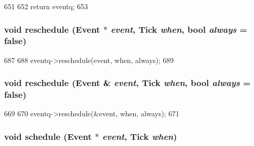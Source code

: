 \begin{DoxyCode}
651     {
652         return eventq;
653     }
\end{DoxyCode}
\hypertarget{classEventManager_a676294f5f01031f3dfdf956185390db8}{
\subsubsection[{reschedule}]{\setlength{\rightskip}{0pt plus 5cm}void reschedule ({\bf Event} $\ast$ {\em event}, \/  {\bf Tick} {\em when}, \/  bool {\em always} = {\ttfamily false})}}
\label{classEventManager_a676294f5f01031f3dfdf956185390db8}



\begin{DoxyCode}
687     {
688         eventq->reschedule(event, when, always);
689     }
\end{DoxyCode}
\hypertarget{classEventManager_a83fe8e2d06cd7c6e36743e5beb07298f}{
\subsubsection[{reschedule}]{\setlength{\rightskip}{0pt plus 5cm}void reschedule ({\bf Event} \& {\em event}, \/  {\bf Tick} {\em when}, \/  bool {\em always} = {\ttfamily false})}}
\label{classEventManager_a83fe8e2d06cd7c6e36743e5beb07298f}



\begin{DoxyCode}
669     {
670         eventq->reschedule(&event, when, always);
671     }
\end{DoxyCode}
\hypertarget{classEventManager_a3abda7ed04856f4f98b31ceacdc78562}{
\subsubsection[{schedule}]{\setlength{\rightskip}{0pt plus 5cm}void schedule ({\bf Event} $\ast$ {\em event}, \/  {\bf Tick} {\em when})}}
\label{classEventManager_a3abda7ed04856f4f98b31ceacdc78562}



